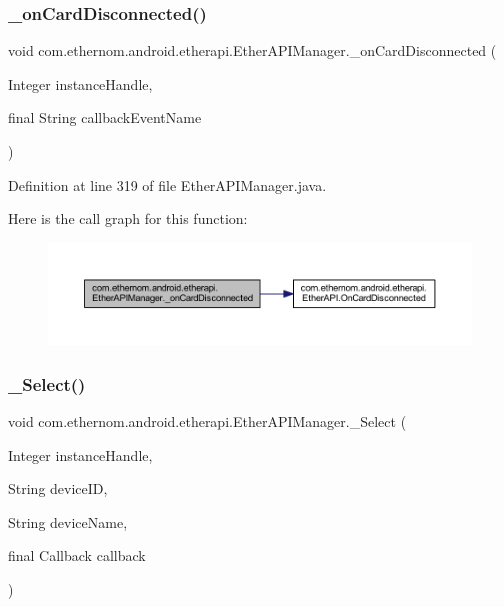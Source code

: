 \subsubsection{\texorpdfstring{\+\_\+on\+Card\+Disconnected()}{\_onCardDisconnected()}}
{\footnotesize\ttfamily void com.\+ethernom.\+android.\+etherapi.\+Ether\+A\+P\+I\+Manager.\+\_\+on\+Card\+Disconnected (\begin{DoxyParamCaption}\item[{Integer}]{instance\+Handle,  }\item[{final String}]{callback\+Event\+Name }\end{DoxyParamCaption})}



Definition at line 319 of file Ether\+A\+P\+I\+Manager.\+java.

Here is the call graph for this function\+:\nopagebreak
\begin{figure}[H]
\begin{center}
\leavevmode
\includegraphics[width=350pt]{classcom_1_1ethernom_1_1android_1_1etherapi_1_1_ether_a_p_i_manager_ac424b3028b3fc9537096f4af9587179b_cgraph}
\end{center}
\end{figure}
\mbox{\label{classcom_1_1ethernom_1_1android_1_1etherapi_1_1_ether_a_p_i_manager_af52a5c37a66de269e947018921f85b4f}} 
\subsubsection{\texorpdfstring{\+\_\+\+Select()}{\_Select()}}
{\footnotesize\ttfamily void com.\+ethernom.\+android.\+etherapi.\+Ether\+A\+P\+I\+Manager.\+\_\+\+Select (\begin{DoxyParamCaption}\item[{Integer}]{instance\+Handle,  }\item[{String}]{device\+ID,  }\item[{String}]{device\+Name,  }\item[{final Callback}]{callback }\end{DoxyParamCaption})}



